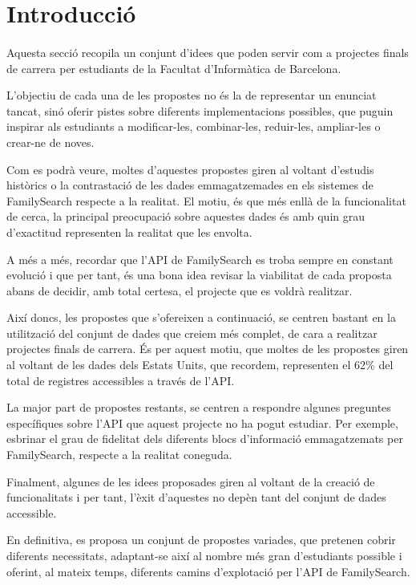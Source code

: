 \section{Introducció}

    \paragraph{}
    Aquesta secció recopila un conjunt d'idees que poden servir com a projectes finals de carrera per estudiants de la Facultat d'Informàtica de Barcelona.

    L'objectiu de cada una de les propostes no és la de representar un enunciat tancat, sinó oferir pistes sobre diferents implementacions possibles, que puguin inspirar als estudiants a modificar-les, combinar-les, reduir-les, ampliar-les o crear-ne de noves.

    Com es podrà veure, moltes d'aquestes propostes giren al voltant d'estudis històrics o la contrastació de les dades emmagatzemades en els sistemes de FamilySearch res\-pec\-te a la realitat. El motiu, és que més enllà de la funcionalitat de cerca, la prin\-ci\-pal preocupació sobre aquestes dades és amb quin grau d'exactitud representen la realitat que les envolta.

    A més a més, recordar que l'API de FamilySearch es troba sempre en constant evolució i que per tant, és una bona idea revisar la viabilitat de cada proposta abans de decidir, amb total certesa, el projecte que es voldrà realitzar.

    Així doncs, les propostes que s’ofereixen a continuació, se centren bastant en la utilització del conjunt de dades que creiem més complet, de cara a realitzar projectes finals de carrera. És per aquest motiu, que moltes de les propostes giren al voltant de les dades dels Estats Units, que recordem, representen el 62\% del total de registres accessibles a través de l’API.

    La major part de propostes restants, se centren a respondre algunes preguntes específiques sobre l’API que aquest projecte no ha pogut estudiar. Per exemple, esbrinar el grau de fidelitat dels diferents blocs d’informació emmagatzemats per FamilySearch, respecte a la realitat coneguda.

    Finalment, algunes de les idees proposades giren al voltant de la creació de funcionalitats i per tant, l’èxit d’aquestes no depèn tant del conjunt de dades accessible.

    En definitiva, es proposa un conjunt de propostes variades, que pretenen cobrir diferents necessitats, adaptant-se així al nombre més gran d'estudiants possible i oferint, al mateix temps, diferents camins d'explotació per l'API de FamilySearch.
